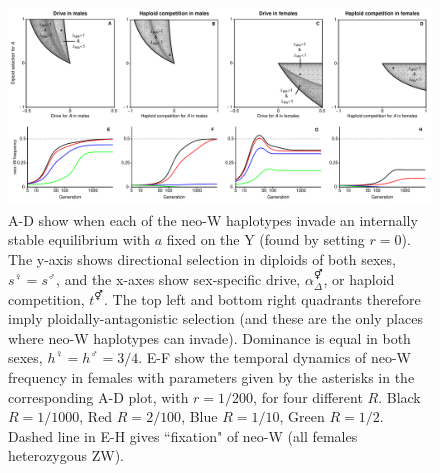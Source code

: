 \documentclass[12pt]{article}
\begin{document}
\begin{landscape}
\begin{figure}[!h]
\centering
\centerline{
\includegraphics[width=\linewidth]{All_plot_combined_PloidAntag_Matt}
}
\caption{
A-D show when each of the neo-W haplotypes invade an internally stable equilibrium with $a$ fixed on the Y (found by setting $r=0$).
The y-axis shows directional selection in diploids of both sexes, $s^\female=s^\male$, and the x-axes show sex-specific drive, $\alpha_\Delta^\Hermaphrodite$, or haploid competition, $t^\Hermaphrodite$.
The top left and bottom right quadrants therefore imply ploidally-antagonistic selection (and these are the only places where neo-W haplotypes can invade).
Dominance is equal in both sexes, $h^\female=h^\male=3/4$. 
E-F show the temporal dynamics of neo-W frequency in females with parameters given by the asterisks in the corresponding A-D plot, with $r=1/200$, for four different $R$.
Black $R=1/1000$, Red $R=2/100$, Blue $R=1/10$, Green $R=1/2$.  
Dashed line in E-H gives ``fixation" of neo-W (all females heterozygous ZW).
}
\label{fig:regionPloidAntag}
\end{figure}
\end{landscape}
\end{document}
